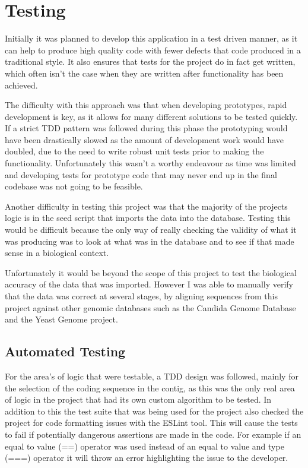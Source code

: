 \section{Testing}
Initially it was planned to develop this application in a test driven manner, as it can help to produce high quality code with fewer defects that code produced in a traditional style.\cite{tdd} It also ensures that tests for the project do in fact get written, which often isn't the case when they are written after functionality has been achieved. 

The difficulty with this approach was that when developing prototypes, rapid development is key, as it allows for many different solutions to be tested quickly. If a strict TDD pattern was followed during this phase the prototyping would have been drastically slowed as the amount of development work would have doubled, due to the need to write robust unit tests prior to making the functionality. Unfortunately this wasn't a worthy endeavour as time was limited and developing tests for prototype code that may never end up in the final codebase was not going to be feasible.

Another difficulty in testing this project was that the majority of the projects logic is in the seed script that imports the data into the database. Testing this would be difficult because the only way of really checking the validity of what it was producing was to look at what was in the database and to see if that made sense in a biological context. 

Unfortunately it would be beyond the scope of this project to test the biological accuracy of the data that was imported. However I was able to manually verify that the data was correct at several stages, by aligning sequences from this project against other genomic databases such as the Candida Genome Database\cite{cgd} and the Yeast Genome\cite{sgd} project. 

\subsection{Automated Testing}
For the area's of logic that were testable, a TDD design was followed, mainly for the selection of the coding sequence in the contig, as this was the only real area of logic in the project that had its own custom algorithm to be tested. In addition to this the test suite that was being used for the project also checked the project for code formatting issues with the ESLint\cite{eslint} tool. This will cause the tests to fail if potentially dangerous assertions are made in the code. For example if an equal to value (==) operator was used instead of an equal to value and type (===) operator it will throw an error highlighting the issue to the developer. 

